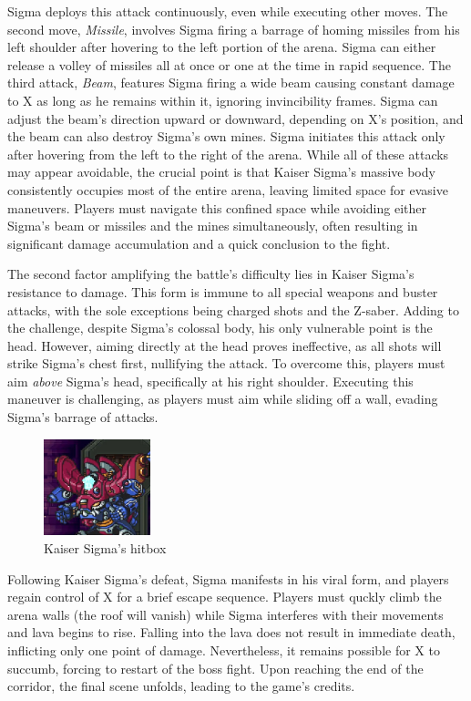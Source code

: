  Sigma deploys this attack continuously, even while executing other moves. The second move, \emph{Missile}, involves Sigma firing a barrage of homing missiles from his left shoulder after hovering to the left portion of the arena. Sigma can either release a volley of missiles all at once or one at the time in rapid sequence. The third attack, \emph{Beam}, features Sigma firing a wide beam causing constant damage to X as long as he remains within it, ignoring invincibility frames. Sigma can adjust the beam's direction upward or downward, depending on X's position, and the beam can also destroy Sigma's own mines. Sigma initiates this attack only after hovering from the left to the right of the arena. While all of these attacks may appear avoidable, the crucial point is that Kaiser Sigma's massive body consistently occupies most of the entire arena, leaving limited space for evasive maneuvers. Players must navigate this confined space while avoiding either Sigma's beam or missiles and the mines simultaneously, often resulting in significant damage accumulation and a quick conclusion to the fight.


The second factor amplifying the battle's difficulty lies in Kaiser Sigma's resistance to damage. This form is immune to all special weapons and buster attacks, with the sole exceptions being charged shots and the Z-saber. Adding to the challenge, despite Sigma's colossal body, his only vulnerable point is the head. However, aiming directly at the head proves ineffective, as all shots will strike Sigma's chest first, nullifying the attack. To overcome this, players must aim \emph{above} Sigma's head, specifically at his right shoulder. Executing this maneuver is challenging, as players must aim while sliding off a wall, evading Sigma's barrage of attacks.

\begin{figure}[htp]
	\centering
	\includegraphics[height=2.8cm]{figures/X3/Doppler_stages/kaiser_hitbox.jpg}
	\caption{Kaiser Sigma's hitbox}
\end{figure}

Following Kaiser Sigma's defeat, Sigma manifests in his viral form, and players regain control of X for a brief escape sequence. Players must quckly climb the arena walls (the roof will vanish) while Sigma interferes with their movements and lava begins to rise. Falling into the lava does not result in immediate death, inflicting only one point of damage. Nevertheless, it remains possible for X to succumb, forcing to restart of the boss fight. Upon reaching the end of the corridor, the final scene unfolds, leading to the game's credits.


